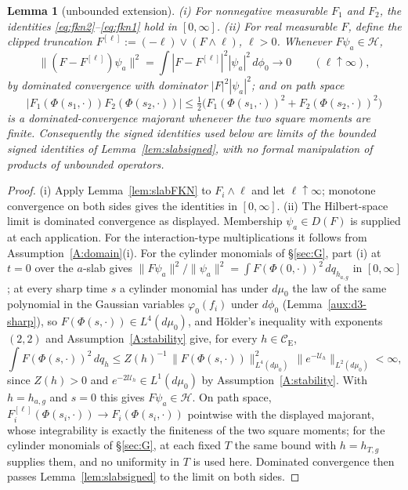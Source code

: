 \documentclass[11pt,a4paper]{article}
\theoremstyle{plain}
\newtheorem{lemma}[theorem]{Lemma}
\theoremstyle{definition}
\theoremstyle{plain}
\theoremstyle{definition}
\newcommand{\CE}{\mathcal{C}_{\mathrm E}}
\newcommand{\HH}{\mathcal{H}}
\begin{document}
\begin{lemma}[unbounded extension]\label{lem:slabunbdd}
\emph{(i)} For nonnegative measurable $F_1$ and $F_2$, the identities
\eqref{eq:fkn2}--\eqref{eq:fkn1} hold in $[0,\infty]$.
\emph{(ii)} For real measurable $F$, define the clipped truncation
$F^{[\ell]}:=(-\ell)\vee(F\wedge\ell)$, $\ell>0$. Whenever $F\psi_a\in\HH$,
\[
 \|(F-F^{[\ell]})\psi_a\|^2
 =\int |F-F^{[\ell]}|^2|\psi_a|^2\,d\phi_0\longrightarrow0
 \qquad(\ell\uparrow\infty),
\]
by dominated convergence with dominator $|F|^2|\psi_a|^2$; and on path space
\[
 |F_1(\Phi(s_1,\cdot))F_2(\Phi(s_2,\cdot))|
 \le\tfrac12\bigl(F_1(\Phi(s_1,\cdot))^2+F_2(\Phi(s_2,\cdot))^2\bigr)
\]
is a dominated-convergence majorant whenever the two square moments are finite. Consequently
the signed identities used below are limits of the bounded signed identities of
Lemma~\ref{lem:slabsigned}, with no formal manipulation of products of unbounded operators.
\end{lemma}

\begin{proof}
(i) Apply Lemma~\ref{lem:slabFKN} to $F_i\wedge\ell$ and let $\ell\uparrow\infty$;
monotone convergence on both sides gives the identities in $[0,\infty]$.
(ii) The Hilbert-space limit is dominated convergence as displayed.  Membership
$\psi_a\in D(F)$ is supplied at each application.  For the interaction-type multiplications
it follows from Assumption~\ref{A:domain}(i).  For the cylinder monomials of \S\ref{sec:G},
part (i) at $t=0$ over the $a$-slab gives
$\|F\psi_a\|^2/\|\psi_a\|^2=\int F(\Phi(0,\cdot))^2\,dq_{h_{a,g}}$ in $[0,\infty]$; at every
sharp time $s$ a cylinder monomial has under $d\mu_0$ the law of the same polynomial in the
Gaussian variables $\varphi_0(f_i)$ under $d\phi_0$ (Lemma~\ref{aux:d3-sharp}), so
$F(\Phi(s,\cdot))\in L^4(d\mu_0)$, and H\"older's inequality with exponents $(2,2)$ and
Assumption~\ref{A:stability} give, for every $h\in\CE$,
\[
 \int F(\Phi(s,\cdot))^2\,dq_h\le Z(h)^{-1}\,\|F(\Phi(s,\cdot))\|_{L^4(d\mu_0)}^2\,
 \|e^{-\mathcal U_h}\|_{L^2(d\mu_0)}<\infty ,
\]
since $Z(h)>0$ and $e^{-2\mathcal U_h}\in L^1(d\mu_0)$ by Assumption~\ref{A:stability}.  With
$h=h_{a,g}$ and $s=0$ this gives $F\psi_a\in\HH$.  On path space,
$F_i^{[\ell]}(\Phi(s_i,\cdot))\to F_i(\Phi(s_i,\cdot))$ pointwise with the displayed
majorant, whose integrability is exactly the finiteness of the two square moments; for the
cylinder monomials of \S\ref{sec:G}, at each fixed $T$ the same bound with $h=h_{T,g}$
supplies them, and no uniformity in $T$ is used here.  Dominated convergence then passes
Lemma~\ref{lem:slabsigned} to the limit on both sides.
\end{proof}
\end{document}
